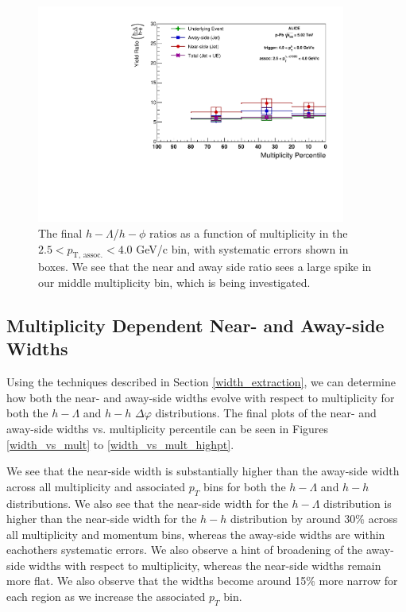 \documentclass[ALICE,manyauthors]{ALICE_analysis_notes}
\begin{document}
\begin{figure}[ht]
\centering
\includegraphics[width=4in]{figures/lambda_phi_ratio_plot_highpt.pdf}
\caption{The final $h-\Lambda$/$h-\phi$ ratios as a function of multiplicity in the $2.5 < p_{\text{T, assoc.}} < 4.0$ GeV/c bin, with systematic errors shown in boxes. We see that the near and away side ratio sees a large spike in our middle multiplicity bin, which is being investigated.}
\label{lambda_phi_ratio_highpt}
\end{figure}
\clearpage

\subsection{Multiplicity Dependent Near- and Away-side Widths}
Using the techniques described in Section \ref{width_extraction}, we can determine how both the near- and away-side widths evolve with respect to multiplicity for both the $h-\Lambda$ and $h-h$ $\Delta\varphi$ distributions. The final plots of the near- and away-side widths vs. multiplicity percentile can be seen in Figures \ref{width_vs_mult} to \ref{width_vs_mult_highpt}.

We see that the near-side width is substantially higher than the away-side width across all multiplicity and associated $p_{T}$ bins for both the $h-\Lambda$ and $h-h$ distributions. We also see that the near-side width for the $h-\Lambda$ distribution is higher than the near-side width for the $h-h$ distribution by around 30\% across all multiplicity and momentum bins, whereas the away-side widths are within eachothers systematic errors. We also observe a hint of broadening of the away-side widths with respect to multiplicity, whereas the near-side widths remain more flat. We also observe that the widths become around 15\% more narrow for each region as we increase the associated $p_{T}$ bin.
\end{document}

